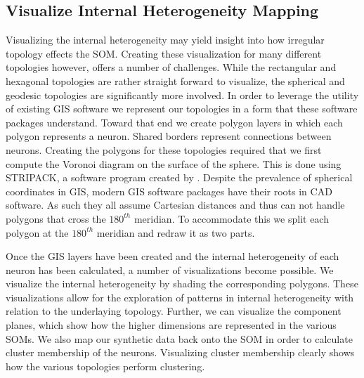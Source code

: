 \subsection{Visualize Internal Heterogeneity Mapping}
Visualizing the internal heterogeneity may yield insight into how irregular topology
effects the SOM.  Creating these visualization for many different topologies
however, offers a number of challenges.  While the rectangular and hexagonal
topologies are rather straight forward to visualize, the spherical and geodesic
topologies are significantly more involved.  In order to leverage the utility
of existing GIS software we represent our topologies in a form that
these software packages understand.  Toward that end we create polygon layers
in which each polygon represents a neuron.  Shared borders represent
connections between neurons.  Creating the polygons for these topologies
required that we first compute the Voronoi diagram on the surface of the
sphere.  This is done using STRIPACK, a software program created by
\cite{Ranka97}.  Despite the prevalence of spherical coordinates
in GIS, modern GIS software packages have their roots in CAD software. As such
they all assume Cartesian distances and thus can not handle polygons that
cross the $180^{th}$ meridian.  To accommodate this we split each polygon at
the $180^{th}$ meridian and redraw it as two parts.

Once the GIS layers have been created and the internal heterogeneity of each
neuron has been calculated, a number of visualizations become possible. We
visualize the internal heterogeneity by shading the corresponding polygons.
These visualizations allow for the exploration of patterns in internal
heterogeneity with relation to the underlaying topology.  Further, we can
visualize the component planes, which show how the higher dimensions are
represented in the various SOMs.  We also map our synthetic data back onto the SOM in
order to calculate cluster membership of the neurons.  Visualizing cluster
membership clearly shows how the various topologies perform clustering.


